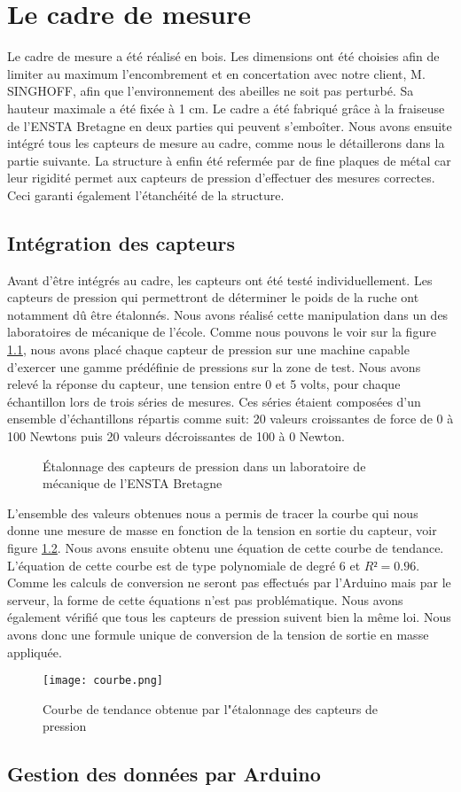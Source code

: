 \chapter{Le cadre de mesure}

Le cadre de mesure a été réalisé en bois. Les dimensions ont été choisies afin de limiter au maximum l'encombrement et en concertation avec notre client, M. SINGHOFF, afin que l'environnement des abeilles ne soit pas perturbé. Sa hauteur maximale a été fixée à 1 cm. 
Le cadre a été fabriqué grâce à la fraiseuse de l'ENSTA Bretagne en deux parties qui peuvent s’emboîter. Nous avons ensuite intégré tous les capteurs de mesure au cadre, comme nous le détaillerons dans la partie suivante. La structure à enfin été refermée par de fine plaques de métal car leur rigidité permet aux capteurs de pression d'effectuer des mesures correctes. Ceci garanti également l'étanchéité de la structure.

\section{Intégration des capteurs}

Avant d'être intégrés au cadre, les capteurs ont été testé individuellement. Les capteurs de pression qui permettront de déterminer le poids de la ruche ont notamment dû être étalonnés. Nous avons réalisé cette manipulation dans un des laboratoires de mécanique de l'école. Comme nous pouvons le voir sur la figure \ref{fig:pression}, nous avons placé chaque capteur de pression sur une machine capable d'exercer une gamme prédéfinie de pressions sur la zone de test. Nous avons relevé la réponse du capteur, une tension entre 0 et 5 volts, pour chaque échantillon lors de trois séries de mesures. Ces séries étaient composées d'un ensemble d'échantillons répartis comme suit: 20 valeurs croissantes de force de 0 à 100 Newtons puis 20 valeurs décroissantes de 100 à 0 Newton.

\begin{figure}[h]
\centering
	\quad
	\caption{\label{fig:pression} \'Etalonnage des capteurs de pression dans un laboratoire de mécanique de l'ENSTA Bretagne }
\end{figure}


L'ensemble des valeurs obtenues nous a permis de tracer la courbe qui nous donne une mesure de masse en fonction de la tension en sortie du capteur, voir figure \ref{fig:courbe}. Nous avons ensuite obtenu une équation de cette courbe de tendance. L'équation de cette courbe est de type polynomiale de degré 6 et $R²=0.96$. Comme les calculs de conversion ne seront pas effectués par l'Arduino mais par le serveur, la forme de cette équations n'est pas problématique. Nous avons également vérifié que tous les capteurs de pression suivent bien la même loi. Nous avons donc une formule unique de conversion de la tension de sortie en masse appliquée.

\begin{figure}[!h]
\centering\texttt{[image: courbe.png]}
\caption{\label{fig:courbe} Courbe de tendance obtenue par l"étalonnage des capteurs de pression}
\end{figure} 

\section{Gestion des données par Arduino}
